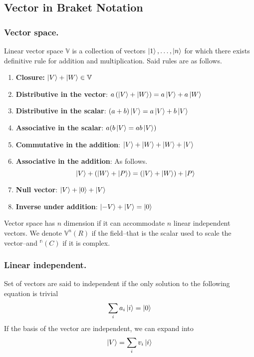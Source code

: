 \documentclass[../main.tex]{subfiles}
\begin{document}
\subsection*{Vector in Braket Notation}
\subsubsection*{Vector space.}
Linear vector space $\mathbb{V}$ is a collection of vectors $\ket{1},\dots,\ket{n}$ for which there exists definitive rule for addition and multiplication.
Said rules are as follows.
\begin{enumerate}
	\item \textbf{Closure:} $\ket{V}+\ket{W}\in \mathbb{V}$
	\item \textbf{Distributive in the vector}: $a\left(\ket{V}+\ket{W}\right)=a\ket{V}+a \ket{W}$
	\item \textbf{Distributive in the scalar}: $(a+b)\ket{V}=a \ket{V}+b \ket{V}$
	\item \textbf{Associative in the scalar}: $a(b\ket{V}=ab\ket{V})$
	\item \textbf{Commutative in the addition}: $\ket{V}+\ket{W}+\ket{W}+\ket{V}$
	\item \textbf{Associative in the addition}: As follows.
	      \begin{equation*}
		      \ket{V}+\left(\ket{W}+\ket{P}\right)=\left(\ket{V}+\ket{W}\right)+\ket{P}
	      \end{equation*}
	\item \textbf{Null vector}: $\ket{V}+\ket{0}+\ket{V}$
	\item \textbf{Inverse under addition}: $\ket{-V}+\ket{V}=\ket{0}$
\end{enumerate}

Vector space has $n$ dimension if it can accommodate $n$ linear independent vectors. 
We denote $\mathbb{V}^n(R)$ if the field--that is the scalar used to scale the vector--and $\mathbb{^n}(C)$ if it is complex.

\subsubsection*{Linear independent.} Set of vectors are said to independent if the only solution to the following equation is trivial
\begin{equation*}
    \sum_i a_i\ket{i}=\ket{0}
\end{equation*}
If the basis of the vector are independent, we can expand into
\begin{equation*}
    \ket{V}=\sum_i v_i \ket{i}
\end{equation*}
\end{document}
